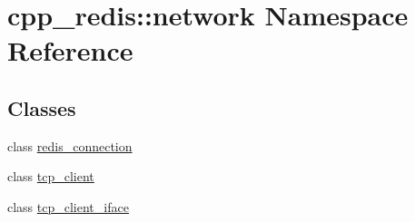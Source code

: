 \hypertarget{namespacecpp__redis_1_1network}{}\section{cpp\+\_\+redis\+:\+:network Namespace Reference}
\label{namespacecpp__redis_1_1network}
\subsection*{Classes}
\begin{DoxyCompactItemize}
\item 
class \hyperlink{classcpp__redis_1_1network_1_1redis__connection}{redis\+\_\+connection}
\item 
class \hyperlink{classcpp__redis_1_1network_1_1tcp__client}{tcp\+\_\+client}
\item 
class \hyperlink{classcpp__redis_1_1network_1_1tcp__client__iface}{tcp\+\_\+client\+\_\+iface}
\end{DoxyCompactItemize}
